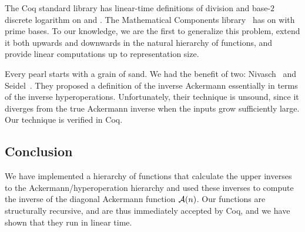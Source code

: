{\color{red}The Coq standard library has linear-time definitions 
of division and base-$2$ discrete logarithm on  and .
The Mathematical Components library~\cite{MathComp} 
has  on  with prime bases. 
To our knowledge, we are the first to generalize this 
problem, extend it both 
upwards and downwards in the natural hierarchy of functions, and
provide linear computations up to representation size.}

Every pearl starts with a grain of sand.  We had the benefit of two: 
Nivasch~\cite{nivasch} and Seidel~\cite{seidel}.
They proposed a definition of the inverse Ackermann essentially in terms of
the inverse hyperoperations.  Unfortunately, their technique is unsound, since it diverges from
the true Ackermann inverse when the inputs grow sufficiently large.  Our technique is verified in Coq.

\subsection{Conclusion}
We have implemented a hierarchy of functions that calculate the upper inverses
to the Ackermann/hyperoperation hierarchy and used these inverses
to compute the inverse of the diagonal Ackermann function $\mathcal{A}(n)$.
Our functions are structurally recursive, and are thus immediately accepted by Coq,
and we have shown that they run in linear time.







